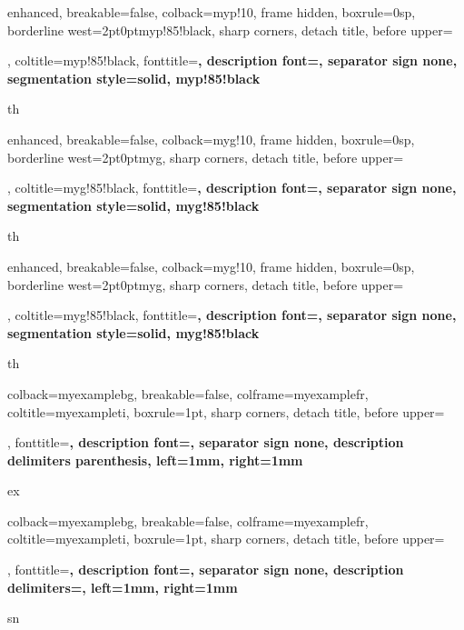 {enhanced, breakable=false, colback=myp!10, frame hidden, boxrule=0sp, 
 borderline west={2pt}{0pt}{myp!85!black}, sharp corners, detach title, 
 before upper={\renewcommand{\familydefault}{\sfdefault}\selectfont\tcbtitle\par\smallskip}, 
 coltitle=myp!85!black, fonttitle=\bfseries\sffamily, description font=\mdseries, 
 separator sign none, segmentation style={solid, myp!85!black}}{th}

{enhanced, breakable=false, colback=myg!10, frame hidden, boxrule=0sp, 
 borderline west={2pt}{0pt}{myg}, sharp corners, detach title, 
 before upper={\renewcommand{\familydefault}{\sfdefault}\selectfont\tcbtitle\par\smallskip}, 
 coltitle=myg!85!black, fonttitle=\bfseries\sffamily, description font=\mdseries, 
 separator sign none, segmentation style={solid, myg!85!black}}{th}

{enhanced, breakable=false, colback=myg!10, frame hidden, boxrule=0sp, 
 borderline west={2pt}{0pt}{myg}, sharp corners, detach title, 
 before upper={\renewcommand{\familydefault}{\sfdefault}\selectfont\tcbtitle\par\smallskip}, 
 coltitle=myg!85!black, fonttitle=\bfseries\sffamily, description font=\mdseries, 
 separator sign none, segmentation style={solid, myg!85!black}}{th}

{colback=myexamplebg, breakable=false, colframe=myexamplefr, coltitle=myexampleti, 
 boxrule=1pt, sharp corners, detach title, 
 before upper={\renewcommand{\familydefault}{\sfdefault}\selectfont\tcbtitle\par\smallskip}, 
 fonttitle=\bfseries\sffamily, description font=\mdseries, 
 separator sign none, description delimiters parenthesis,
 left=1mm, %
 right=1mm %
}{ex}

{colback=myexamplebg, breakable=false, colframe=myexamplefr, coltitle=myexampleti, 
 boxrule=1pt, sharp corners, detach title, 
 before upper={\renewcommand{\familydefault}{\sfdefault}\selectfont\tcbtitle\par\smallskip}, 
 fonttitle=\bfseries\sffamily, description font=\mdseries, 
 separator sign none, description delimiters={}, %
 left=1mm, %
 right=1mm %
}{sn}


